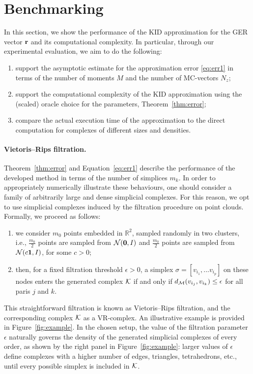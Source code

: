 \section{Benchmarking}\label{sec:benchmark}

In this section, we show the performance of the KID approximation for the GER vector \( \mathbf{r} \) and its computational complexity. In particular, through our experimental evaluation, we aim to do the following:
\begin{enumerate}[label=\bfseries(\roman*),leftmargin=*]
      \item support the asymptotic estimate for the approximation error \eqref{eq:err1} in terms of the number of moments \( M \) and the number of MC-vectors \( N_z \);
      \item support the computational complexity of the KID approximation using the (scaled) oracle choice for the parameters, Theorem~\ref{thm:error};
      \item compare the actual execution time of the approximation to the direct computation for complexes of different sizes and densities.
\end{enumerate}

\paragraph{Vietoris--Rips filtration.} Theorem~\ref{thm:error} and Equation~\eqref{eq:err1} describe the performance of the developed method in terms of the number of simplices \( m_k \). In order to appropriately numerically illustrate these behaviours, one should consider a family of arbitrarily large and dense simplicial complexes. For this reason, we opt to use simplicial complexes induced by the filtration procedure on point clouds. Formally, we proceed as follows:
\begin{enumerate}[leftmargin=*]
      \item  we consider \( m_0 \) points embedded in $\mathbb R^2$, sampled randomly in two clusters, i.e., \( \frac{m_0}{2}\) points are sampled from \( \mathcal{N}( \mathbf{0}, I )\) and \( \frac{m_0}{2}\) points are sampled from \( \mathcal{N}( c \mathbf{1}, I )\), for some \( c > 0 \); 
      \item then, for a fixed filtration threshold \( \epsilon > 0 \), a simplex \( \sigma = [v_{i_1}, ... v_{i_p} ] \) on these nodes enters the generated complex \( \mathcal{K} \) if and only if $d_{\mathcal{M} }(v_{i_j}, v_{i_k}) \le \epsilon$ for all paris $j$ and $k$. 
\end{enumerate}
This straightforward filtration is known as  Vietoris--Rips filtration, and the corresponding complex \( \mathcal{K} \) as a VR-complex. An illustrative example is provided in Figure~\ref{fig:example}. In the chosen setup, the value of the filtration parameter \( \epsilon \) naturally governs the density of the generated simplicial complexes of every order, as shown by the right panel in Figure~\ref{fig:example}: larger values of \( \epsilon \) define complexes with a higher number of edges, triangles, tetrahedrons, etc., until every possible simplex is included in \( \mathcal{K} \).

